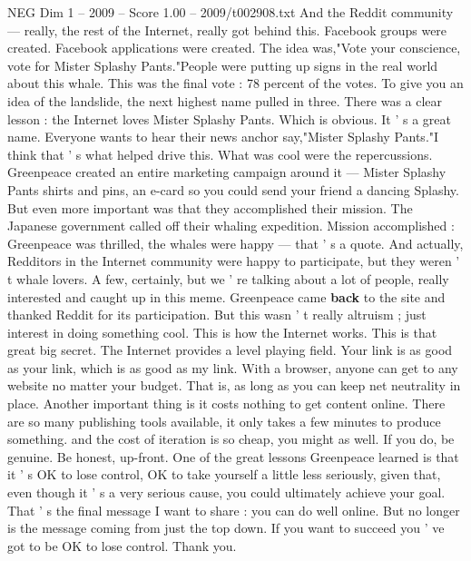 \begin{textsample}{NEG Dim 1 – 2009 – Score 1.00 – 2009/t002908.txt}
And the Reddit community — really, the rest of the Internet, really got behind this.
Facebook groups were created.
Facebook applications were created.
The idea was,"Vote your conscience, vote for Mister Splashy Pants."People were putting up signs in the real world about this whale.
This was the final vote : 78 percent of the votes.
To give you an idea of the landslide, the next highest name pulled in three.
There was a clear lesson : the Internet loves Mister Splashy Pants.
Which is obvious.
It ' s a great name.
Everyone wants to hear their news anchor say,"Mister Splashy Pants."I think that ' s what helped drive this.
What was cool were the repercussions.
Greenpeace created an entire marketing campaign around it — Mister Splashy Pants shirts and pins, an e-card so you could send your friend a dancing Splashy.
But even more important was that they accomplished their mission.
The Japanese government called off their whaling expedition.
Mission accomplished : Greenpeace was thrilled, the whales were happy — that ' s a quote.
And actually, Redditors in the Internet community were happy to participate, but they weren ' t whale lovers.
A few, certainly, but we ' re talking about a lot of people, really interested and caught up in this meme.
Greenpeace came \textbf{back} to the site and thanked Reddit for its participation.
But this wasn ' t really altruism ; just interest in doing something cool.
This is how the Internet works.
This is that great big secret.
The Internet provides a level playing field.
Your link is as good as your link, which is as good as my link.
With a browser, anyone can get to any website no matter your budget.
That is, as long as you can keep net neutrality in place.
Another important thing is it costs nothing to get content online.
There are so many publishing tools available, it only takes a few minutes to produce something. and the cost of iteration is so cheap, you might as well.
If you do, be genuine.
Be honest, up-front.
One of the great lessons Greenpeace learned is that it ' s OK to lose control, OK to take yourself a little less seriously, given that, even though it ' s a very serious cause, you could ultimately achieve your goal.
That ' s the final message I want to share : you can do well online.
But no longer is the message coming from just the top down.
If you want to succeed you ' ve got to be OK to lose control.
Thank you.

\end{textsample}
